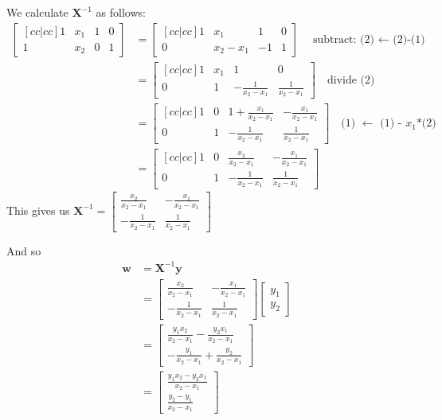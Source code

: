 \documentclass{harvardml}
\theoremstyle{definition}
\theoremstyle{plain}
\begin{document}
We calculate $\mathbf{X}^{-1}$ as follows:
\begin{align*}
    \begin{bmatrix}[cc|cc] 
    1 & x_1 & 1 & 0\\ 
    1 & x_2 & 0 & 1
    \end{bmatrix} &= 
    \begin{bmatrix}[cc|cc] 
    1 & x_1 & 1 & 0\\ 
    0 & x_2 - x_1 & -1 & 1
    \end{bmatrix} \quad \text{subtract: (2) $\leftarrow$ (2)-(1)}\\
    &= \begin{bmatrix}[cc|cc] 
    1 & x_1 & 1 & 0\\ 
    0 & 1 & -\frac{1}{x_2 - x_1} & \frac{1}{x_2 - x_1}
    \end{bmatrix} \quad \text{divide (2)}\\
    &= \begin{bmatrix}[cc|cc] 
    1 & 0 & 1+\frac{x_1}{x_2 - x_1} & -\frac{x_1}{x_2 - x_1}\\ 
    0 & 1 & -\frac{1}{x_2 - x_1} & \frac{1}{x_2 - x_1}
    \end{bmatrix} \quad \text{(1) $\leftarrow$ (1) - $x_1$*(2)}\\
    &= \begin{bmatrix}[cc|cc] 
    1 & 0 & \frac{x_2}{x_2 - x_1} & -\frac{x_1}{x_2 - x_1}\\ 
    0 & 1 & -\frac{1}{x_2 - x_1} & \frac{1}{x_2 - x_1}
    \end{bmatrix}
\end{align*}
This gives us $\mathbf{X}^{-1} = \begin{bmatrix}
    \frac{x_2}{x_2 - x_1} & -\frac{x_1}{x_2 - x_1}\\ 
    -\frac{1}{x_2 - x_1} & \frac{1}{x_2 - x_1}
    \end{bmatrix}$

And so 
\begin{align*}
    \mathbf{w} &= \mathbf{X}^{-1} \mathbf{y} \\
    &= \begin{bmatrix}
    \frac{x_2}{x_2 - x_1} & -\frac{x_1}{x_2 - x_1}\\ 
    -\frac{1}{x_2 - x_1} & \frac{1}{x_2 - x_1}
    \end{bmatrix} \begin{bmatrix}  y_1 \\ y_2 \end{bmatrix} \\
    &= \begin{bmatrix}
    \frac{y_1x_2}{x_2 - x_1} -\frac{y_2x_1}{x_2 - x_1}\\ 
    -\frac{y_1}{x_2 - x_1} + \frac{y_2}{x_2 - x_1}
    \end{bmatrix} \\
    &= \begin{bmatrix}
    \frac{y_1x_2-y_2x_1}{x_2 - x_1}\\ 
    \frac{y_2-y_1}{x_2 - x_1}
    \end{bmatrix}
\end{align*}
\end{document}

